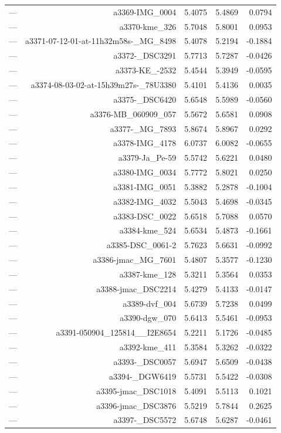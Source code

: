 \begin{table}[htbp]
\begin{tabular}{lrrrr}
— & a3369-IMG_0004 & 5.4075 & 5.4869 & 0.0794 \\
— & a3370-kme_326 & 5.7048 & 5.8001 & 0.0953 \\
— & a3371-07-12-01-at-11h32m58s-_MG_8498 & 5.4078 & 5.2194 & -0.1884 \\
— & a3372-_DSC3291 & 5.7713 & 5.7287 & -0.0426 \\
— & a3373-KE_-2532 & 5.4544 & 5.3949 & -0.0595 \\
— & a3374-08-03-02-at-15h39m27s-_78U3380 & 5.4101 & 5.4136 & 0.0035 \\
— & a3375-_DSC6420 & 5.6548 & 5.5989 & -0.0560 \\
— & a3376-MB_060909_057 & 5.5672 & 5.6581 & 0.0908 \\
— & a3377-_MG_7893 & 5.8674 & 5.8967 & 0.0292 \\
— & a3378-IMG_4178 & 6.0737 & 6.0082 & -0.0655 \\
— & a3379-Ja_Pe-59 & 5.5742 & 5.6221 & 0.0480 \\
— & a3380-IMG_0034 & 5.7772 & 5.8021 & 0.0250 \\
— & a3381-IMG_0051 & 5.3882 & 5.2878 & -0.1004 \\
— & a3382-IMG_4032 & 5.5043 & 5.4698 & -0.0345 \\
— & a3383-DSC_0022 & 5.6518 & 5.7088 & 0.0570 \\
— & a3384-kme_524 & 5.6534 & 5.4873 & -0.1661 \\
— & a3385-DSC_0061-2 & 5.7623 & 5.6631 & -0.0992 \\
— & a3386-jmac_MG_7601 & 5.4807 & 5.3577 & -0.1230 \\
— & a3387-kme_128 & 5.3211 & 5.3564 & 0.0353 \\
— & a3388-jmac_DSC2214 & 5.4279 & 5.4133 & -0.0147 \\
— & a3389-dvf_004 & 5.6739 & 5.7238 & 0.0499 \\
— & a3390-dgw_070 & 5.6413 & 5.5461 & -0.0953 \\
— & a3391-050904_125814__I2E8654 & 5.2211 & 5.1726 & -0.0485 \\
— & a3392-kme_411 & 5.3584 & 5.3262 & -0.0322 \\
— & a3393-_DSC0057 & 5.6947 & 5.6509 & -0.0438 \\
— & a3394-_DGW6419 & 5.5731 & 5.5422 & -0.0308 \\
— & a3395-jmac_DSC1018 & 5.4091 & 5.5113 & 0.1021 \\
— & a3396-jmac_DSC3876 & 5.5219 & 5.7844 & 0.2625 \\
— & a3397-_DSC5572 & 5.6748 & 5.6287 & -0.0461 \\

\end{tabular}
\end{table}
